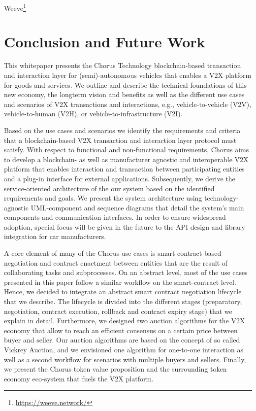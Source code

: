 \documentclass{llncs}
\begin{document}
{			Weeve\footnote{\url{https://weeve.network/}} \cite{weeveWhitepaper}
		
		
	

	\section{Conclusion and Future Work}
		\label{s:section-8}	

		This whitepaper presents the Chorus Technology blockchain-based transaction and interaction layer for (semi)-autonomous vehicles that enables a V2X platform for goods and services. We outline and describe the technical foundations of this new economy, the longterm vision and benefits as well as the different use cases and scenarios of V2X transactions and interactions, e.g., vehicle-to-vehicle (V2V), vehicle-to-human (V2H), or vehicle-to-infrastructure (V2I).
		
		Based on the use cases and scenarios we identify the requirements and criteria that a blockchain-based V2X transaction and interaction layer protocol must satisfy. With respect to functional and non-functional requirements, Chorus aims to develop a blockchain- as well as manufacturer agnostic and interoperable V2X platform that enables interaction and transaction between participating entities and a plug-in interface for external applications.
		Subsequently, we derive the service-oriented architecture of the our system based on the identified requirements and goals. We present the system architecture using technology-agnostic UML-component and sequence diagrams that detail the system’s main components and communication interfaces. In order to ensure widespread adoption, special focus will be given in the future to the API design and library integration for car manufacturers.
		
		A core element of many of the Chorus use cases is smart contract-based negotiation and contract enactment between
		entities that are the result of collaborating tasks and subprocesses. On an abstract level, most of the use cases presented in this paper follow a similar workflow on the smart-contract level. Hence, we decided to integrate an abstract smart contract negotiation lifecycle that we describe. The lifecycle is divided into the different stages (preparatory, negotiation, contract execution, rollback and contract expiry stage) that we explain in detail. Furthermore, we designed two auction algorithms for the V2X economy that allow to reach an efficient consensus on a certain price between buyer and seller. Our auction algorithms are based on the concept of so called Vickrey Auction, and we envisioned one algorithm for one-to-one interaction as well as a second workflow for scenarios with multiple buyers and sellers. Finally, we present the Chorus token value proposition and the surrounding token economy eco-system that fuels the V2X platform.
		
}
\end{document}
